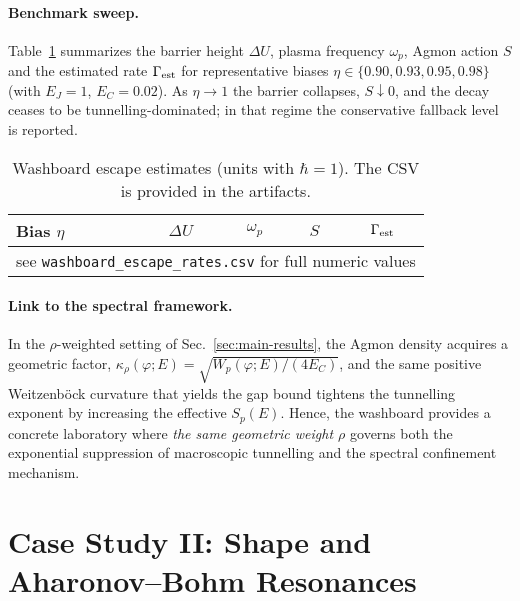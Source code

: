 \documentclass[11pt]{article}
\theoremstyle{definition}
\begin{document}
    
    \paragraph{Benchmark sweep.}
    Table~\ref{tab:washboard-sweep} summarizes the barrier height \(\Delta U\), plasma frequency \(\omega_p\), Agmon action \(S\) and the estimated rate \(\Gamma_{\rm est}\) for representative biases \(\eta\in\{0.90,0.93,0.95,0.98\}\) (with \(E_J=1\), \(E_C=0.02\)).
    As \(\eta\to 1\) the barrier collapses, \(S\downarrow 0\), and the decay ceases to be tunnelling-dominated; in that regime the conservative fallback level is reported.
    
    \begin{table}[t]
    	\centering
    	\caption{Washboard escape estimates (units with \(\hbar=1\)). The CSV is provided in the artifacts.}
    	\label{tab:washboard-sweep}
    	\begin{tabular}{lcccc}
    		\toprule
    		Bias \(\eta\) & \(\Delta U\) & \(\omega_p\) & \(S\) & \(\Gamma_{\rm est}\) \\
    		\midrule
    		\multicolumn{5}{c}{see \texttt{washboard\_escape\_rates.csv} for full numeric values}\\
    		
\bottomrule
    	\end{tabular}
    \end{table}
    
    \paragraph{Link to the spectral framework.}
    In the \(\rho\)-weighted setting of Sec.~\ref{sec:main-results}, the Agmon density acquires a geometric factor, \(\kappa_\rho(\varphi;E)=\sqrt{W_p(\varphi;E)/(4E_C)}\), and the same positive Weitzenböck curvature that yields the
    gap bound tightens the tunnelling exponent by increasing the effective \(S_p(E)\).
    Hence, the washboard provides a concrete laboratory where \emph{the same geometric weight \(\rho\)} governs both the exponential suppression of macroscopic tunnelling and the spectral confinement mechanism.
    
    
    \section{Case Study II: Shape and Aharonov--Bohm Resonances}
    \label{sec:shape-ab}
    
\end{document}
